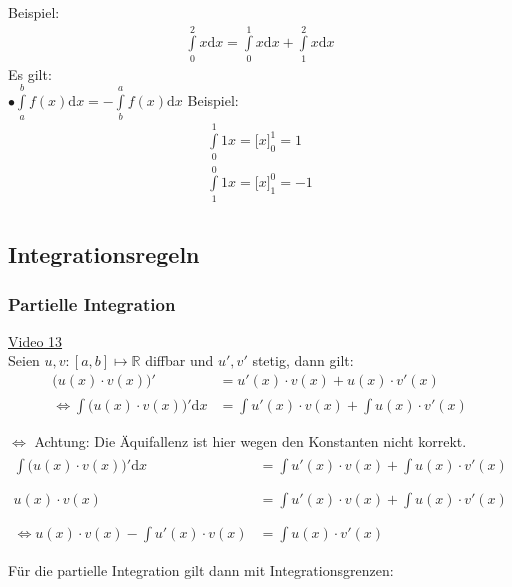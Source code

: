 Beispiel:\\
\begin{align*}
\int\limits_{0}^{2}x\mathrm{d}x=\int\limits_{0}^{1} x\mathrm{d}x +\int\limits_{1}^{2}x\mathrm{d}x
\end{align*}
\newpage
\noindent
Es gilt:\\
$\bullet  \int\limits_{a}^{b}f(x) \mathrm{d}x=-\int\limits_{b}^{a}f(x)\mathrm{d}x  $ 
Beispiel:\\
\begin{align*}
\int\limits_{0}^{1} 1x=\big[x\big]^1_0=1\\
\int\limits_{1}^{0} 1x=\big[x\big]^0_1=-1\\
\end{align*}
\subsection{Integrationsregeln}
\subsubsection{Partielle Integration }
\href{https://youtu.be/bsTdvvGm7Ic}{Video 13}\\
Seien $ u,v:[a,b]\longmapsto \mathbb{R} $ diffbar und $ u', v' $ stetig, dann gilt:\\
\begin{align*}
\big(u(x)\cdot v(x)\big)'&=u'(x)\cdot v(x) +u(x)\cdot v'(x)\\
\Leftrightarrow \int\limits_{}^{}\big(u(x)\cdot v(x)\big)'\mathrm{d}x  &=\int\limits_{}^{}u'(x)\cdot v(x)+\int\limits_{}^{}u(x)\cdot v'(x)  \\
\end{align*}
$ \Leftrightarrow $ Achtung: Die Äquifallenz ist hier wegen den Konstanten nicht korrekt.\\
\begin{align*}
\int\limits_{}^{}\big(u(x)\cdot v(x)\big)'\mathrm{d}x  &=\int\limits_{}^{}u'(x)\cdot v(x)+\int\limits_{}^{}u(x)\cdot v'(x)  \\
u(x)\cdot v(x)  &=\int\limits_{}^{}u'(x)\cdot v(x)+\int\limits_{}^{}u(x)\cdot v'(x)  \\
\Leftrightarrow u(x)\cdot v(x)-\int\limits_{}^{}u'(x)\cdot v(x)&=\int\limits_{}^{}u(x)\cdot v'(x)  \\
\end{align*}
Für die partielle Integration gilt dann mit Integrationsgrenzen:\\
\begin{center}
\end{center}
